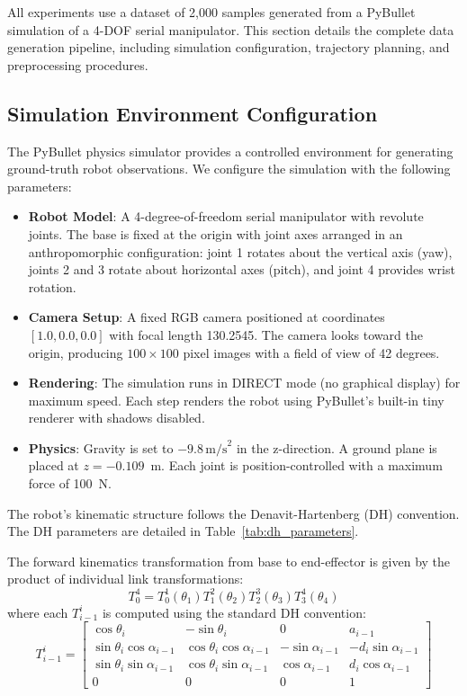 \documentclass[12pt,a4paper,oneside]{report}
\begin{document}
All experiments use a dataset of 2,000 samples generated from a PyBullet simulation of a 4-DOF serial manipulator. This section details the complete data generation pipeline, including simulation configuration, trajectory planning, and preprocessing procedures.

\subsection{Simulation Environment Configuration}
The PyBullet physics simulator provides a controlled environment for generating ground-truth robot observations. We configure the simulation with the following parameters:
\begin{itemize}
    \item \textbf{Robot Model}: A 4-degree-of-freedom serial manipulator with revolute joints. The base is fixed at the origin with joint axes arranged in an anthropomorphic configuration: joint 1 rotates about the vertical axis (yaw), joints 2 and 3 rotate about horizontal axes (pitch), and joint 4 provides wrist rotation.
    \item \textbf{Camera Setup}: A fixed RGB camera positioned at coordinates $[1.0, 0.0, 0.0]$ with focal length 130.2545. The camera looks toward the origin, producing $100 \times 100$ pixel images with a field of view of 42 degrees.
    \item \textbf{Rendering}: The simulation runs in DIRECT mode (no graphical display) for maximum speed. Each step renders the robot using PyBullet's built-in tiny renderer with shadows disabled.
    \item \textbf{Physics}: Gravity is set to $-9.8 \, \text{m/s}^2$ in the z-direction. A ground plane is placed at $z = -0.109$~m. Each joint is position-controlled with a maximum force of 100~N.
\end{itemize}

The robot's kinematic structure follows the Denavit-Hartenberg (DH) convention. The DH parameters are detailed in Table~\ref{tab:dh_parameters}.

The forward kinematics transformation from base to end-effector is given by the product of individual link transformations:
\begin{equation}
T_{0}^{4} = T_{0}^{1}(\theta_1) T_{1}^{2}(\theta_2) T_{2}^{3}(\theta_3) T_{3}^{4}(\theta_4)
\end{equation}
where each $T_{i-1}^{i}$ is computed using the standard DH convention:
\begin{equation}
T_{i-1}^{i} = 
\begin{bmatrix}
\cos\theta_i & -\sin\theta_i & 0 & a_{i-1} \\
\sin\theta_i \cos\alpha_{i-1} & \cos\theta_i \cos\alpha_{i-1} & -\sin\alpha_{i-1} & -d_i \sin\alpha_{i-1} \\
\sin\theta_i \sin\alpha_{i-1} & \cos\theta_i \sin\alpha_{i-1} & \cos\alpha_{i-1} & d_i \cos\alpha_{i-1} \\
0 & 0 & 0 & 1
\end{bmatrix}
\end{equation}
\end{document}
